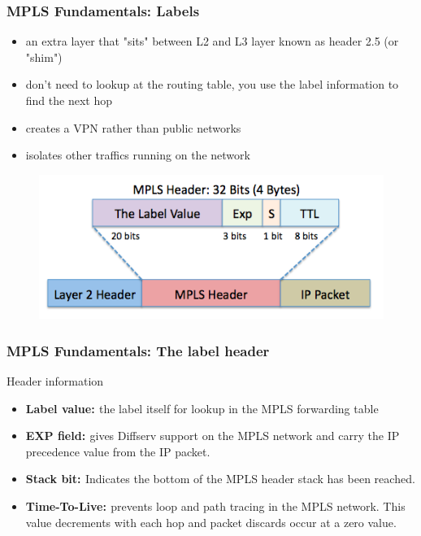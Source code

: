 \documentclass[12pt]{beamer}
\begin{document}
\begin{frame}
  \frametitle{MPLS Fundamentals: Labels}
  \begin{itemize}
    \item an extra layer that "sits" between L2 and L3 layer known as header 2.5 (or "shim")
    \item don't need to lookup at the routing table, you use the label information to find the next hop
    \item creates a VPN rather than public networks
    \item isolates other traffics running on the network
  \end{itemize}
  \begin{figure}[h]
    \begin{center}
      \includegraphics[scale=0.40]{header_mpls.png}
    \end{center}
  \end{figure}    
\end{frame}

\begin{frame}
  \frametitle{MPLS Fundamentals: The label header}
    Header information
    \begin{itemize}
      \item {\bf{Label value: }}the label itself for lookup in the MPLS forwarding table
      \item {\bf{EXP field: }}gives Diffserv support on the MPLS network and carry the IP precedence value from the IP packet.
      \item {\bf{Stack bit: }}Indicates the bottom of the MPLS header stack has been reached.
      \item {\bf{Time-To-Live: }}prevents loop and path tracing in the MPLS network. This value decrements with each hop and packet discards occur at a zero value.
    \end{itemize}       
\end{frame}
\end{document}
